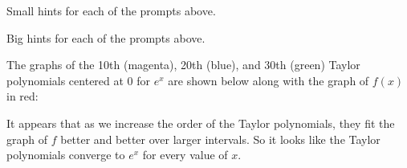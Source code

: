 \begin{smallhint}
\ba
	\item Small hints for each of the prompts above.
\ea
\end{smallhint}
\begin{bighint}
\ba
	\item Big hints for each of the prompts above.
\ea
\end{bighint}
\begin{activitySolution}
\ba
	\item The graphs of the 10th (magenta), 20th (blue), and 30th (green) Taylor polynomials centered at 0 for $e^x$ are shown below along with the graph of $f(x)$ in red:
\begin{center}  \end{center} 
It appears that as we increase the order of the Taylor polynomials, they fit the graph of $f$ better and better over larger intervals. So it looks like the Taylor polynomials converge to $e^x$ for every value of $x$. 


\end{activitySolution}
